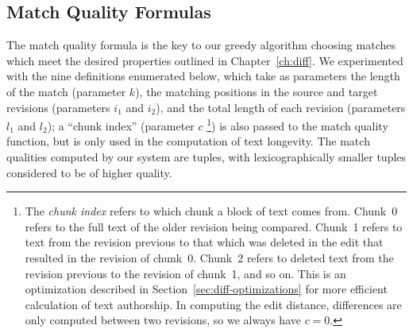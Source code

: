 \begin{description}
\end{description}



\subsection{Match Quality Formulas}

The match quality formula is the key to our greedy algorithm
choosing matches which meet the desired properties outlined
in Chapter~\ref{ch:diff}.
We experimented with the nine definitions enumerated below,
which take as parameters the length of the match (parameter $k$),
the matching positions in the source and target revisions
(parameters $i_1$ and $i_2$), and the total length of
each revision (parameters $l_1$ and $l_2$);
a ``chunk index'' (parameter $c$
\footnote{The \textit{chunk index} refers
to which chunk a block of text comes from.
Chunk~0 refers to the full text of the older revision being compared.
Chunk~1 refers to text from the revision previous to that which was
deleted in the edit that resulted in the revision of chunk~0.
Chunk~2 refers to deleted text from the revision previous to the
revision of chunk~1, and so on.
This is an optimization described in Section~\ref{sec:diff-optimizations}
for more efficient calculation of text authorship.
In computing the edit distance, differences are only computed
between two revisions, so we always have $c=0$.
}) is also passed to the match quality function,
but is only used in the computation of text longevity.
The match qualities computed by our system are tuples,
with lexicographically smaller tuples considered to be
of higher quality.


